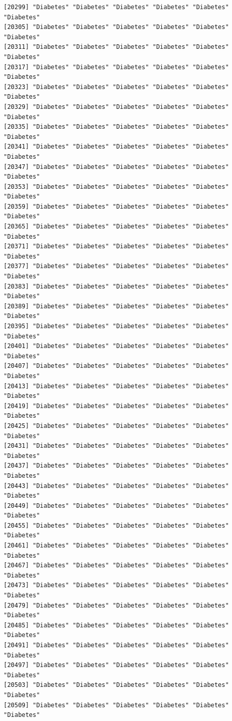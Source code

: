 \documentclass[
  letterpaper,
  DIV=11,
  numbers=noendperiod]{scrartcl}
\begin{document}
\begin{verbatim}
[20299] "Diabetes" "Diabetes" "Diabetes" "Diabetes" "Diabetes" "Diabetes"
[20305] "Diabetes" "Diabetes" "Diabetes" "Diabetes" "Diabetes" "Diabetes"
[20311] "Diabetes" "Diabetes" "Diabetes" "Diabetes" "Diabetes" "Diabetes"
[20317] "Diabetes" "Diabetes" "Diabetes" "Diabetes" "Diabetes" "Diabetes"
[20323] "Diabetes" "Diabetes" "Diabetes" "Diabetes" "Diabetes" "Diabetes"
[20329] "Diabetes" "Diabetes" "Diabetes" "Diabetes" "Diabetes" "Diabetes"
[20335] "Diabetes" "Diabetes" "Diabetes" "Diabetes" "Diabetes" "Diabetes"
[20341] "Diabetes" "Diabetes" "Diabetes" "Diabetes" "Diabetes" "Diabetes"
[20347] "Diabetes" "Diabetes" "Diabetes" "Diabetes" "Diabetes" "Diabetes"
[20353] "Diabetes" "Diabetes" "Diabetes" "Diabetes" "Diabetes" "Diabetes"
[20359] "Diabetes" "Diabetes" "Diabetes" "Diabetes" "Diabetes" "Diabetes"
[20365] "Diabetes" "Diabetes" "Diabetes" "Diabetes" "Diabetes" "Diabetes"
[20371] "Diabetes" "Diabetes" "Diabetes" "Diabetes" "Diabetes" "Diabetes"
[20377] "Diabetes" "Diabetes" "Diabetes" "Diabetes" "Diabetes" "Diabetes"
[20383] "Diabetes" "Diabetes" "Diabetes" "Diabetes" "Diabetes" "Diabetes"
[20389] "Diabetes" "Diabetes" "Diabetes" "Diabetes" "Diabetes" "Diabetes"
[20395] "Diabetes" "Diabetes" "Diabetes" "Diabetes" "Diabetes" "Diabetes"
[20401] "Diabetes" "Diabetes" "Diabetes" "Diabetes" "Diabetes" "Diabetes"
[20407] "Diabetes" "Diabetes" "Diabetes" "Diabetes" "Diabetes" "Diabetes"
[20413] "Diabetes" "Diabetes" "Diabetes" "Diabetes" "Diabetes" "Diabetes"
[20419] "Diabetes" "Diabetes" "Diabetes" "Diabetes" "Diabetes" "Diabetes"
[20425] "Diabetes" "Diabetes" "Diabetes" "Diabetes" "Diabetes" "Diabetes"
[20431] "Diabetes" "Diabetes" "Diabetes" "Diabetes" "Diabetes" "Diabetes"
[20437] "Diabetes" "Diabetes" "Diabetes" "Diabetes" "Diabetes" "Diabetes"
[20443] "Diabetes" "Diabetes" "Diabetes" "Diabetes" "Diabetes" "Diabetes"
[20449] "Diabetes" "Diabetes" "Diabetes" "Diabetes" "Diabetes" "Diabetes"
[20455] "Diabetes" "Diabetes" "Diabetes" "Diabetes" "Diabetes" "Diabetes"
[20461] "Diabetes" "Diabetes" "Diabetes" "Diabetes" "Diabetes" "Diabetes"
[20467] "Diabetes" "Diabetes" "Diabetes" "Diabetes" "Diabetes" "Diabetes"
[20473] "Diabetes" "Diabetes" "Diabetes" "Diabetes" "Diabetes" "Diabetes"
[20479] "Diabetes" "Diabetes" "Diabetes" "Diabetes" "Diabetes" "Diabetes"
[20485] "Diabetes" "Diabetes" "Diabetes" "Diabetes" "Diabetes" "Diabetes"
[20491] "Diabetes" "Diabetes" "Diabetes" "Diabetes" "Diabetes" "Diabetes"
[20497] "Diabetes" "Diabetes" "Diabetes" "Diabetes" "Diabetes" "Diabetes"
[20503] "Diabetes" "Diabetes" "Diabetes" "Diabetes" "Diabetes" "Diabetes"
[20509] "Diabetes" "Diabetes" "Diabetes" "Diabetes" "Diabetes" "Diabetes"

\end{verbatim}
\end{document}
